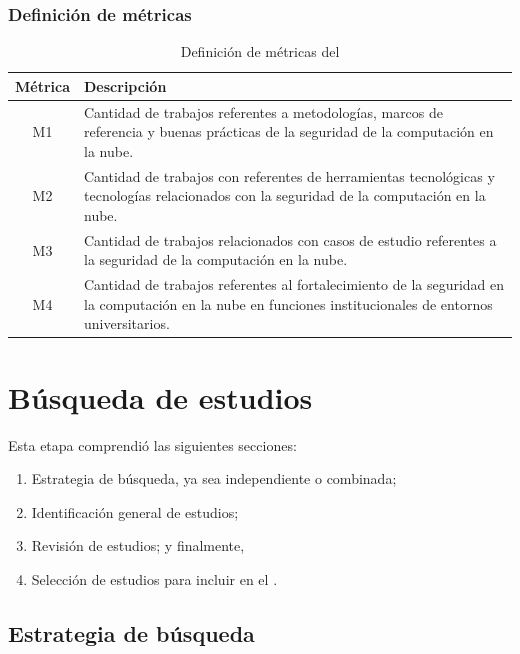 \subsubsection{Definición de métricas}
\begin{table}[H]
	\centering
	\renewcommand{\arraystretch}{1.2} %
	\fontsize{9pt}{10pt}\selectfont %
	\begin{tabular}{|c|p{13cm}|} %
		\hline
		\textbf{Métrica} & \textbf{Descripción} \\ 
		\hline
		M1 & Cantidad de trabajos referentes a  metodologías, marcos de referencia y buenas prácticas  de la seguridad de la computación en la nube. \\
    	M2 & Cantidad de trabajos con referentes de herramientas tecnológicas y tecnologías relacionados con la seguridad de la computación en la nube. \\
    	M3 & Cantidad de trabajos relacionados con casos de estudio referentes a la seguridad de la computación en la nube. \\
    	M4 & Cantidad de trabajos referentes al fortalecimiento de la seguridad en la computación en la nube en funciones institucionales de entornos universitarios. \\
    \hline
	\end{tabular}
	\caption{Definición de métricas del \SMS}\label{tab:metricas}
\end{table}


\newpage \section{Búsqueda de estudios}


Esta etapa comprendió las siguientes secciones:
\begin{enumerate}
	\item Estrategia de búsqueda, ya sea independiente o combinada;
	\item Identificación general de estudios;
	\item Revisión de estudios; y finalmente,
	\item Selección de estudios para incluir en el \SMS.\@
\end{enumerate}

\subsection{Estrategia de búsqueda}

